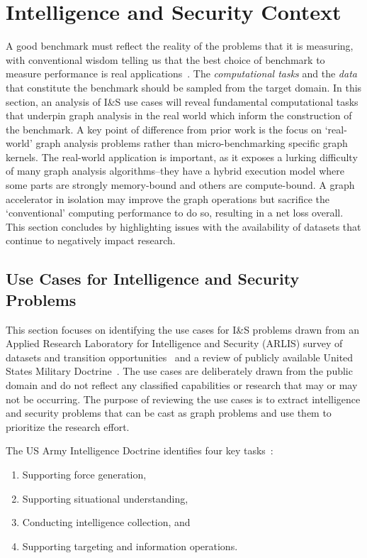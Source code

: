 \section{Intelligence and Security Context}
\label{section:11-Intelligence-Security-Context}

A good benchmark must reflect the reality of the problems that it is measuring, with conventional wisdom telling us that the best choice of benchmark to measure performance is real applications~\cite{Hennessy2019}.
The \textit{computational tasks} and the \textit{data} that constitute the benchmark should be sampled from the target domain. 
In this section, an analysis of I\&S use cases will reveal fundamental computational tasks that underpin graph analysis in the real world which inform the construction of the benchmark.
A key point of difference from prior work is the focus on `real-world' graph analysis problems rather than micro-benchmarking specific graph kernels.
The real-world application is important, as it exposes a lurking difficulty of many graph analysis algorithms--they have a hybrid execution model where some parts are strongly memory-bound and others are compute-bound. 
A graph accelerator in isolation may improve the graph operations but sacrifice the `conventional' computing performance to do so, resulting in a net loss overall.
This section concludes by highlighting issues with the availability of datasets that continue to negatively impact research.

\subsection{Use Cases for Intelligence and Security Problems}
\label{section:IS-Use-Cases}

This section focuses on identifying the use cases for I\&S problems drawn from an Applied Research Laboratory for Intelligence and Security (ARLIS) survey of datasets and transition opportunities~\cite{Regli2022a} and a review of publicly available United States Military Doctrine~\cite{Army2019, Army2019a, Army2023}. 
The use cases are deliberately drawn from the public domain and do not reflect any classified capabilities or research that may or may not be occurring. 
The purpose of reviewing the use cases is to extract intelligence and security problems that can be cast as graph problems and use them to prioritize the research effort. 

The US Army Intelligence Doctrine identifies four key tasks~\cite{Army2019}:
\begin{enumerate}
    \item Supporting force generation,
    \item Supporting situational understanding,
    \item Conducting intelligence collection, and 
    \item Supporting targeting and information operations.
\end{enumerate}

